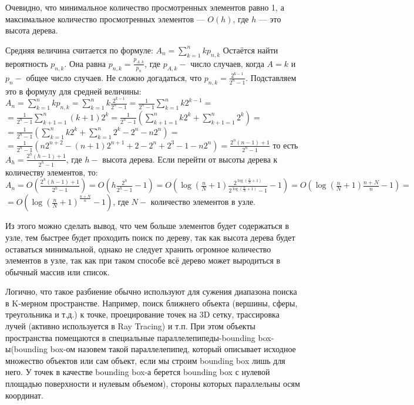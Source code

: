 \documentclass[a4paper, 12pt]{article}
\begin{document}
	Очевидно, что минимальное количество просмотренных элементов равно 1, а максимальное количество просмотренных элементов — $O(h)$, где $h$ — это высота дерева.
	
	Средняя величина считается по формуле: $A_{n}=\sum_{k=1}^{n} k p_{n, k}$
	Остаётся найти вероятность $p_{n, k}$. Она равна $p_{n, k}=\frac{p_{A, k}}{p_{n}}$, где $p_{A, k}-$ число случаев, когда $A=k$ и $p_{n}-$ общее число случаев. Не сложно догадаться, что $p_{n, k}=\frac{2^{k-1}}{2^{n}-1}$.
	Подставляем это в формулу для средней величины:
	$A_{n}=\sum_{k=1}^{n} k p_{n, k}=\sum_{k=1}^{n} k \frac{2^{k-1}}{2^{n}-1}=\frac{1}{2^{n}-1} \sum_{k=1}^{n} k 2^{k-1}=$
	$=\frac{1}{2^{n}-1} \sum_{k+1=1}^{n}(k+1) 2^{k}=\frac{1}{2^{n}-1}\left(\sum_{k+1=1}^{n} k 2^{k}+\sum_{k+1=1}^{n} 2^{k}\right)=$
	$=\frac{1}{2^{n}-1}\left(\sum_{k=1}^{n} k 2^{k}+\sum_{k=1}^{n} 2^{k}-2^{n}-n 2^{n}\right)=$
	$=\frac{1}{2^{n}-1}\left(n 2^{n+2}-(n+1) 2^{n+1}+2-2^{n}+2^{3}-1-n 2^{n}\right)=\frac{2^{n}(n-1)+1}{2^{n}-1}$
	то есть $A_{h}=\frac{2^{h}(h-1)+1}{2^{h}-1}$, где $h-$ высота дерева.
	Если перейти от высоты дерева к количеству элементов, то: $A_{n}=O\left(\frac{2^{h}(h-1)+1}{2^{h}-1}\right)=O\left(h \frac{2^{h}}{2^{h}-1}-1\right)=O\left(\log \left(\frac{n}{N}+1\right) \frac{2^{\log \left(\frac{n}{N}+1\right)}}{2^{\log \left(\frac{n}{N}+1\right)}-1}-1\right)=O\left(\log \left(\frac{n}{N}+1\right) \frac{n+N}{n}-1\right)=$
	$=O\left(\log \left(\frac{n}{N}+1\right)^{\frac{n+N}{n}}-1\right)$, где $N-$ количество элементов в узле.
	
	Из этого можно сделать вывод, что чем больше элементов будет содержаться в узле, тем быстрее будет проходить поиск по дереву, так как высота дерева будет оставаться минимальной, однако не следует хранить огромное количество элементов в узле, так как при таком способе всё дерево может выродиться в обычный массив или список.
	
	Логично, что такое разбиение обычно используют для сужения диапазона поиска в K-мерном пространстве. Например, поиск ближнего объекта (вершины, сферы, треугольника и т.д.) к точке, проецирование точек на 3D сетку, трассировка лучей (активно используется в Ray Tracing) и т.п. При этом объекты пространства помещаются в специальные параллелепипеды-bounding box-ы(bounding box-ом назовем такой параллелепипед, который описывает исходное множество объектов или сам объект, если мы строим bounding box лишь для него. У точек в качестве bounding box-а берется bounding box с нулевой площадью поверхности и нулевым объемом), стороны которых параллельны осям координат.
\end{document}
